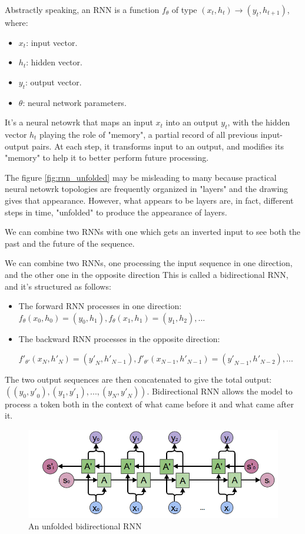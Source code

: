 \documentclass{article}
\begin{document}
Abstractly speaking, an RNN is a function $f_{\theta}$ of type $(x_t, h_t) \rightarrow (y_t, h_{t+1})$, where:
\begin{itemize}
  \item $x_t$: input vector.
  \item $h_t$: hidden vector.
  \item $y_t$: output vector.
  \item $\theta$: neural network parameters.
\end{itemize}

It's a neural netowrk that maps an input $x_t$ into an output $y_t$, with the hidden vector $h_t$ playing the role of "memory", a partial record of all previous input-output pairs.
At each step, it transforms input to an output, and modifies its "memory" to help it to better perform future processing.

The figure \ref{fig:rnn_unfolded} may be misleading to many because practical neural netowrk topologies are frequently organized in "layers" and the drawing gives that appearance.
However, what appears to be layers are, in fact, different steps in time, "unfolded" to produce the appearance of layers.

We can combine two RNNs with one which gets an inverted input to see both the past and the future of the sequence.

We can combine two RNNs, one processing the input sequence in one direction, and the other one in the opposite direction
This is called a bidirectional RNN, and it's structured as follows:
\begin{itemize}
  \item The forward RNN processes in one direction: $f_{\theta}(x_0, h_0) = (y_0, h_1), f_{\theta}(x_1, h_1) = (y_1, h_2), ...$
  \item The backward RNN processes in the opposite direction:
  
  ${f'}_{\theta '}(x_N, {h'}_N) = ({y'}_N, {h'}_{N-1}), {f'}_{\theta '}(x_{N-1}, {h'}_{N-1}) = ({y'}_{N-1},{h'}_{N-2}), ...$
\end{itemize}

The two output sequences are then concatenated to give the total output: $((y_0, {y'}_0), (y_1, {y'}_1), ..., (y_N, {y'}_N))$.
Bidirectional RNN allows the model to process a token both in the context of what came before it and what came after it.

\begin{figure}[htbp]
  \centering
  \includegraphics[width=0.8\linewidth]{img/rnn_bidirectional.png}
  \caption{An unfolded bidirectional RNN}
  \label{fig:rnn_bidirectional}
\end{figure}
\end{document}
